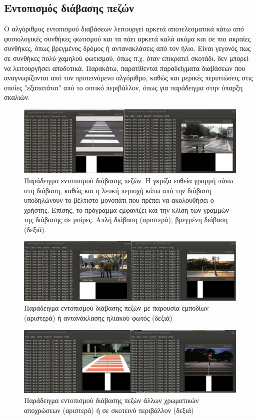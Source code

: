 \subsection{Εντοπισμός διάβασης πεζών}
Ο αλγόριθμος εντοπισμού διαβάσεων λειτουργεί αρκετά αποτελεσματικά κάτω από φυσιολογικές συνθήκες φωτισμού και τα πάει αρκετά καλά ακόμα και σε πιο ακραίες συνθήκες, όπως βρεγμένος δρόμος ή αντανακλάσεις από τον ήλιο. Είναι γεγονός πως σε συνθήκες πολύ χαμηλού φωτισμού, όπως π.χ. όταν επικρατεί σκοτάδι, δεν μπορεί να λειτουργήσει αποδοτικά. Παρακάτω, παρατίθενται παραδείγματα διαβάσεων που αναγνωρίζονται από τον προτεινόμενο αλγόριθμο, καθώς και μερικές περιπτώσεις στις οποίες "εξαπατάται" από το οπτικό περιβάλλον, όπως για παράδειγμα στην ύπαρξη σκαλιών.
\begin{figure}[H]
    \centering
    \includegraphics[width=\textwidth]{images/test_zebra1.png}
    \caption{Παράδειγμα εντοπισμού διάβασης πεζών. Η γκρίζα ευθεία γραμμή πάνω στη διάβαση, καθώς και η λευκή περιοχή κάτω από την διάβαση υποδηλώνουν το βέλτιστο μονοπάτι που πρέπει να ακολουθήσει ο χρήστης. Επίσης, το πρόγραμμα εμφανίζει και την κλίση των γραμμών της διάβασης σε μοίρες. Απλή διάβαση (αριστερά), βρεγμένη διάβαση (δεξιά).}
    \label{fig:test-zebra1}
\end{figure}
\begin{figure}[H]
    \centering
    \includegraphics[width=\textwidth]{images/test_zebra3.png}
    \caption{Παράδειγμα εντοπισμού διάβασης πεζών με παρουσία εμποδίων (αριστερά) ή αντανάκλασης ηλιακού φωτός (δεξιά)}
    \label{fig:test-zebra3}
\end{figure}
\begin{figure}[H]
    \centering
    \includegraphics[width=\textwidth]{images/test_zebra2.png}
    \caption{Παράδειγμα εντοπισμού διάβασης πεζών άλλων χρωματικών αποχρώσεων (αριστερά) ή σε σκοτεινό περιβάλλον (δεξιά)}
    \label{fig:test-zebra2}
\end{figure}
